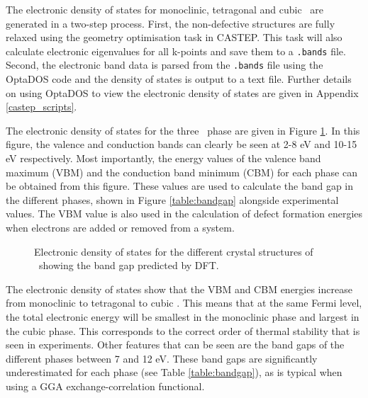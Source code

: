 The electronic density of states for monoclinic, tetragonal and cubic \zirconia\ are generated in a two-step process. First, the non-defective structures are fully relaxed using the geometry optimisation task in CASTEP. This task will also calculate electronic eigenvalues for all k-points and save them to a \texttt{.bands} file. Second, the electronic band data is parsed from the \texttt{.bands} file using the OptaDOS code \cite{Nicholls2012, Morris2014} and the density of states is output to a text file. Further details on using OptaDOS to view the electronic density of states are given in Appendix \ref{castep_scripts}.

The electronic density of states for the three \zirconia\ phase are given in Figure \ref{figure:densityofstates}. In this figure, the valence and conduction bands can clearly be seen at 2-8 eV and 10-15 eV respectively. Most importantly, the energy values of the valence band maximum (VBM) and the conduction band minimum (CBM) for each phase can be obtained from this figure. These values are used to calculate the band gap in the different phases, shown in Figure \ref{table:bandgap} alongside experimental values. The VBM value is also used in the calculation of defect formation energies when electrons are added or removed from a system.

\begin{figure}[ht]
\begin{center}
		\caption{Electronic density of states for the different crystal structures of \zirconia\ showing the band gap predicted by DFT.}
		\label{figure:densityofstates}
	\end{center}
\end{figure}

The electronic density of states show that the VBM and CBM energies increase from monoclinic to tetragonal to cubic \zirconia . This means that at the same Fermi level, the total electronic energy will be smallest in the monoclinic phase and largest in the cubic phase. This corresponds to the correct order of thermal stability that is seen in experiments. Other features that can be seen are the band gaps of the different phases between 7 and 12 eV. These band gaps are significantly underestimated for each phase (see Table \ref{table:bandgap}), as is typical when using a GGA exchange-correlation functional.

